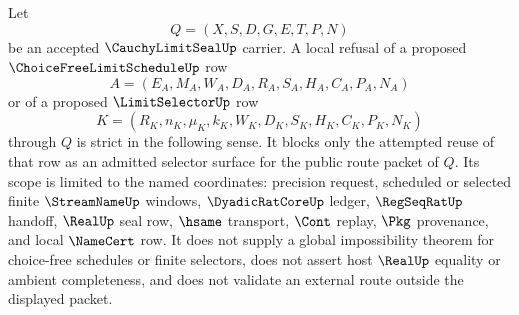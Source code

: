 \begin{corollary}
\label{cor:cauchy-limit-seal-choice-free-selector-admission-strict-obstruction}
Let
$$
Q=(X,S,D,G,E,T,P,N)
$$
be an accepted $\CauchyLimitSealUp$ carrier. A local refusal of a proposed $\ChoiceFreeLimitScheduleUp$ row
$$
A=(E_A,M_A,W_A,D_A,R_A,S_A,H_A,C_A,P_A,N_A)
$$
or of a proposed $\LimitSelectorUp$ row
$$
K=(R_K,n_K,\mu_K,k_K,W_K,D_K,S_K,H_K,C_K,P_K,N_K)
$$
through $Q$ is strict in the following sense. It blocks only the attempted reuse of that row as an admitted selector surface for the public route packet of $Q$. Its scope is limited to the named coordinates: precision request, scheduled or selected finite $\StreamNameUp$ windows, $\DyadicRatCoreUp$ ledger, $\RegSeqRatUp$ handoff, $\RealUp$ seal row, $\hsame$ transport, $\Cont$ replay, $\Pkg$ provenance, and local $\NameCert$ row. It does not supply a global impossibility theorem for choice-free schedules or finite selectors, does not assert host $\RealUp$ equality or ambient completeness, and does not validate an external route outside the displayed packet.
\end{corollary}
